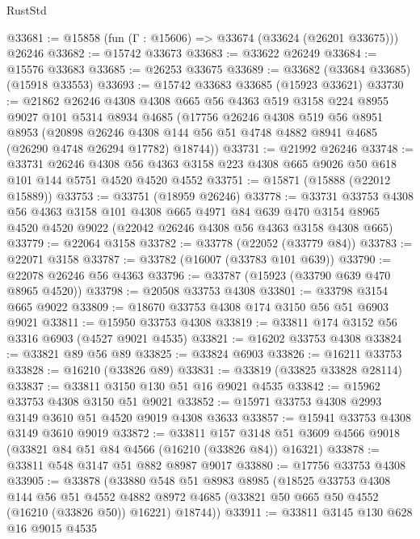 \begin{lexlean}{RustStd}
\begin{coremodule}
@33681 := @15858 (fun (Γ : @15606) => @33674 (@33624 (@26201 @33675))) @26246
@33682 := @15742 @33673
@33683 := @33622 @26249
@33684 := @15576 @33683
@33685 := @26253 @33675
@33689 := @33682 (@33684 @33685) (@15918 @33553)
@33693 := @15742 @33683 @33685 (@15923 @33621)
@33730 := @21862
    @26246
    @4308
    @4308
    @665
    @56
    @4363
    @519
    @3158
    @224
    @8955
    @9027
    @101
    @5314
    @8934
    @4685
    (@17756
      @26246
      @4308
      @519
      @56
      @8951
      @8953
      (@20898
        @26246
        @4308
        @144
        @56
        @51
        @4748
        @4882
        @8941
        @4685
        (@26290 @4748 @26294 @17782)
        @18744))
@33731 := @21992 @26246
@33748 := @33731
    @26246
    @4308
    @56
    @4363
    @3158
    @223
    @4308
    @665
    @9026
    @50
    @618
    @101
    @144
    @5751
    @4520
    @4520
    @4552
@33751 := @15871 (@15888 (@22012 @15889))
@33753 := @33751 (@18959 @26246)
@33778 := @33731
    @33753
    @4308
    @56
    @4363
    @3158
    @101
    @4308
    @665
    @4971
    @84
    @639
    @470
    @3154
    @8965
    @4520
    @4520
    @9022
    (@22042 @26246 @4308 @56 @4363 @3158 @4308 @665)
@33779 := @22064 @3158
@33782 := @33778 (@22052 (@33779 @84))
@33783 := @22071 @3158
@33787 := @33782 (@16007 (@33783 @101 @639))
@33790 := @22078 @26246 @56 @4363
@33796 := @33787 (@15923 (@33790 @639 @470 @8965 @4520))
@33798 := @20508 @33753 @4308
@33801 := @33798 @3154 @665 @9022
@33809 := @18670 @33753 @4308 @174 @3150 @56 @51 @6903 @9021
@33811 := @15950 @33753 @4308
@33819 := @33811 @174 @3152 @56 @3316 @6903 (@4527 @9021 @4535)
@33821 := @16202 @33753 @4308
@33824 := @33821 @89 @56 @89
@33825 := @33824 @6903
@33826 := @16211 @33753
@33828 := @16210 (@33826 @89)
@33831 := @33819 (@33825 @33828 @28114)
@33837 := @33811 @3150 @130 @51 @16 @9021 @4535
@33842 := @15962 @33753 @4308 @3150 @51 @9021
@33852 := @15971 @33753 @4308 @2993 @3149 @3610 @51 @4520 @9019 @4308 @3633
@33857 := @15941 @33753 @4308 @3149 @3610 @9019
@33872 := @33811
    @157
    @3148
    @51
    @3609
    @4566
    @9018
    (@33821 @84 @51 @84 @4566 (@16210 (@33826 @84)) @16321)
@33878 := @33811 @548 @3147 @51 @882 @8987 @9017
@33880 := @17756 @33753 @4308
@33905 := @33878
    (@33880
      @548
      @51
      @8983
      @8985
      (@18525
        @33753
        @4308
        @144
        @56
        @51
        @4552
        @4882
        @8972
        @4685
        (@33821 @50 @665 @50 @4552 (@16210 (@33826 @50)) @16221)
        @18744))
@33911 := @33811 @3145 @130 @628 @16 @9015 @4535

\end{coremodule}
\end{lexlean}
